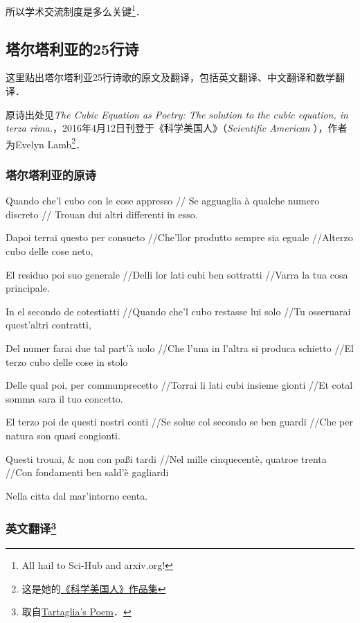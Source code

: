 所以学术交流制度是多么关键\footnote{All hail to Sci-Hub and arxiv.org! }．


\subsection{塔尔塔利亚的25行诗}\label{PlyRtS_sub2}

这里贴出塔尔塔利亚25行诗歌的原文及翻译，包括英文翻译、中文翻译和数学翻译．

原诗出处见\textsl{The Cubic Equation as Poetry:
The solution to the cubic equation, in terza rima.}，2016年4月12日刊登于《科学美国人》（\textsl{Scientific American} ），作者为Evelyn Lamb\footnote{这是她的\href{https://www.scientificamerican.com/author/evelyn-lamb/}{《科学美国人》作品集}}．



\subsubsection{塔尔塔利亚的原诗}

Quando che'l cubo con le cose appresso 
//
Se agguaglia à qualche numero discreto
//
Trouan dui altri differenti in esso.



Dapoi terrai questo per consueto
​//Che'llor produtto sempre sia eguale
//​Alterzo cubo delle cose neto,
 

El residuo poi suo generale 
//Delli lor lati cubi ben sottratti
//​Varra la tua cosa principale.
 

In el secondo de cotestiatti 
​//Quando che'l cubo restasse lui solo 
//Tu osseruarai quest'altri contratti,
 

Del numer farai due tal part'à uolo 
//Che l'una in l'altra si produca schietto
//El terzo cubo delle cose in stolo
​

Delle qual poi, per communprecetto 
​//Torrai li lati cubi insieme gionti 
//Et cotal somma sara il tuo concetto.
 

El terzo poi de questi nostri conti 
//Se solue col secondo se ben guardi 
//Che per natura son quasi congionti.
 

Questi trouai, & non con paßi tardi 
//Nel mille cinquecentè, quatroe trenta 
//Con fondamenti ben sald'è gagliardi
​

Nella citta dal mar'intorno centa.


\subsubsection{英文翻译\footnote{取自\href{https://www.maa.org/press/periodicals/convergence/how-tartaglia-solved-the-cubic-equation-tartaglias-poem．}{Tartaglia's Poem}．}}

